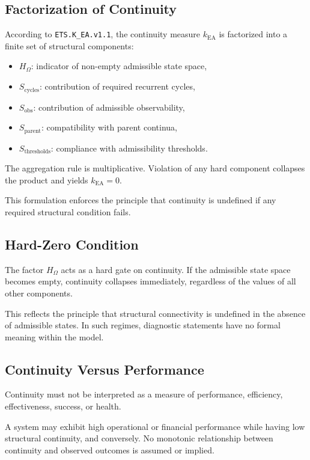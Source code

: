 \subsection{Factorization of Continuity}

According to \texttt{ETS.K\_EA.v1.1}, the continuity measure
$k_{\mathrm{EA}}$ is factorized into a finite set of structural
components:

\begin{itemize}
  \item $H_{\Omega}$: indicator of non-empty admissible state space,
  \item $S_{\text{cycles}}$: contribution of required recurrent cycles,
  \item $S_{\text{obs}}$: contribution of admissible observability,
  \item $S_{\text{parent}}$: compatibility with parent continua,
  \item $S_{\text{thresholds}}$: compliance with admissibility
        thresholds.
\end{itemize}

The aggregation rule is multiplicative.
Violation of any hard component collapses the product and yields
$k_{\mathrm{EA}} = 0$.

This formulation enforces the principle that continuity is undefined if
any required structural condition fails.

\subsection{Hard-Zero Condition}

The factor $H_{\Omega}$ acts as a hard gate on continuity.
If the admissible state space becomes empty, continuity collapses
immediately, regardless of the values of all other components.

This reflects the principle that structural connectivity is undefined in
the absence of admissible states.
In such regimes, diagnostic statements have no formal meaning within the
model.

\subsection{Continuity Versus Performance}

Continuity must not be interpreted as a measure of performance,
efficiency, effectiveness, success, or health.

A system may exhibit high operational or financial performance while
having low structural continuity, and conversely.
No monotonic relationship between continuity and observed outcomes is
assumed or implied.

